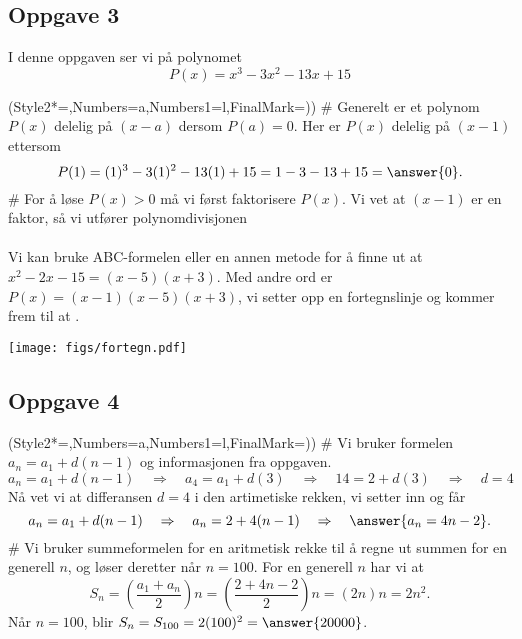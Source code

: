 \subsection*{Oppgave 3}
I denne oppgaven ser vi på polynomet
\begin{equation*}
	P(x) = x^3 - 3x^2 - 13x + 15
\end{equation*}
\begin{easylist}[enumerate]
	\ListProperties(Style2*=,Numbers=a,Numbers1=l,FinalMark={)})
	# Generelt er et polynom $P(x)$ delelig på $(x-a)$ dersom $P(a) = 0$.
	Her er $P(x)$ delelig på $(x-1)$ ettersom 
	\begin{equation*}
	P(1) = (1)^3 - 3(1)^2 - 13(1) + 15 = 1 - 3 - 13 + 15 = \answer{0}.
	\end{equation*}
	# For å løse $P(x) > 0$ må vi først faktorisere $P(x)$.
	Vi vet at $(x-1)$ er en faktor, så vi utfører polynomdivisjonen \\
	 \\
	Vi kan bruke ABC-formelen eller en annen metode for å finne ut at $x^2 - 2x -15 = (x - 5)(x + 3)$. 
	Med andre ord er $P(x) = (x - 1)(x - 5)(x + 3)$, vi setter opp en fortegnslinje og kommer frem til at .
\end{easylist}

\begin{center}
	\texttt{[image: figs/fortegn.pdf]}
\end{center}

\subsection*{Oppgave 4}
\begin{easylist}[enumerate]
	\ListProperties(Style2*=,Numbers=a,Numbers1=l,FinalMark={)})
	# Vi bruker formelen $a_n = a_1 + d(n-1)$ og informasjonen fra oppgaven.
	\begin{equation*}
		a_n = a_1 + d(n-1) \quad \Rightarrow \quad 
		a_4 = a_1 + d(3) \quad \Rightarrow \quad 
		14 = 2 + d(3) \quad \Rightarrow \quad
		d = 4
	\end{equation*}
	Nå vet vi at differansen $d=4$ i den artimetiske rekken, vi setter inn og får
	\begin{equation*}
		a_n = a_1 + d(n-1) \quad \Rightarrow \quad  
		a_n = 2 + 4(n-1) \quad \Rightarrow \quad
		\answer{a_n = 4n - 2}.
	\end{equation*}
	# Vi bruker summeformelen for en aritmetisk rekke til å regne ut summen for en generell $n$, og løser deretter når $n = 100$.
	For en generell $n$ har vi at
	\begin{equation*}
		S_n = \left(\frac{a_1 + a_n}{2}\right) n 
		= \left(\frac{2 + 4n - 2}{2}\right) n
		= \left( 2n\right) n = 2n^2.
	\end{equation*}
	Når $n= 100$, blir $S_n = S_{100} = 2 (100)^2 = \answer{20000}$.
\end{easylist}

